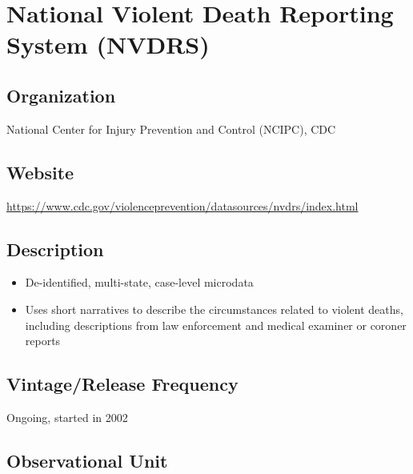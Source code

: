 \documentclass[
]{book}
\providecommand{\tightlist}{%
  \setlength{\itemsep}{0pt}\setlength{\parskip}{0pt}}
\begin{document}
\mainmatter

\hypertarget{national-violent-death-reporting-system-nvdrs}{%
\chapter{National Violent Death Reporting System (NVDRS)}\label{national-violent-death-reporting-system-nvdrs}}

\hypertarget{organization-66}{%
\section{Organization}\label{organization-66}}

National Center for Injury Prevention and Control (NCIPC), CDC

\hypertarget{website-66}{%
\section{Website}\label{website-66}}

\url{https://www.cdc.gov/violenceprevention/datasources/nvdrs/index.html}

\hypertarget{description-66}{%
\section{Description}\label{description-66}}

\begin{itemize}
\tightlist
\item
  De-identified, multi-state, case-level microdata
\item
  Uses short narratives to describe the circumstances related to violent deaths, including descriptions from law enforcement and medical examiner or coroner reports
\end{itemize}

\hypertarget{vintagerelease-frequency-66}{%
\section{Vintage/Release Frequency}\label{vintagerelease-frequency-66}}

Ongoing, started in 2002

\hypertarget{observational-unit-66}{%
\section{Observational Unit}\label{observational-unit-66}}
\end{document}
